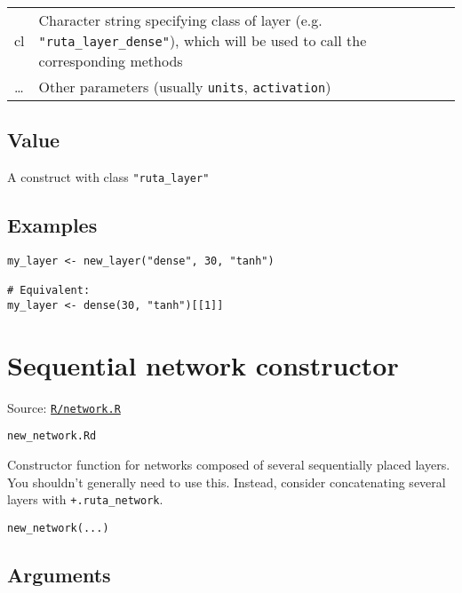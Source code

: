 \begin{longtable}[c]{@{}ll@{}}
\toprule
cl & Character string specifying class of layer (e.g.
\texttt{"ruta\_layer\_dense"}), which will be used to call the
corresponding methods\tabularnewline
\ldots{} & Other parameters (usually \texttt{units},
\texttt{activation})\tabularnewline
\bottomrule
\end{longtable}

\hypertarget{value}{\subsection{\texorpdfstring{\protect\hyperlink{value}{}Value}{Value}}\label{value}}

A construct with class \texttt{"ruta\_layer"}

\hypertarget{examples}{\subsection{\texorpdfstring{\protect\hyperlink{examples}{}Examples}{Examples}}\label{examples}}

\begin{verbatim}
my_layer <- new_layer("dense", 30, "tanh")

# Equivalent:
my_layer <- dense(30, "tanh")[[1]]
\end{verbatim}

\section{Sequential network
constructor}\label{sequential-network-constructor}

Source:
\href{https://github.com/fdavidcl/ruta/blob/master/R/network.R}{\texttt{R/network.R}}

\texttt{new\_network.Rd}

Constructor function for networks composed of several sequentially
placed layers. You shouldn't generally need to use this. Instead,
consider concatenating several layers with \texttt{+.ruta\_network}.

\begin{verbatim}
new_network(...)
\end{verbatim}

\hypertarget{arguments}{\subsection{\texorpdfstring{\protect\hyperlink{arguments}{}Arguments}{Arguments}}\label{arguments}}

